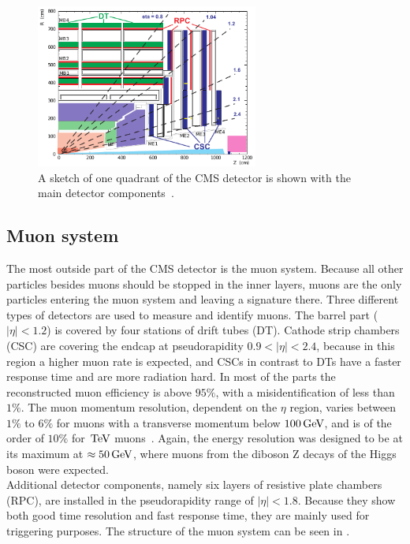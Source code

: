 \begin{figure}[tbp]
 \centering
 \includegraphics[width=0.65\textwidth]{figures/general/muonChamber}
 \caption{A sketch of one quadrant of the CMS detector is shown with the main detector components~\cite{CMSTDR}.}
 \label{fig:etaPlaneCMSTotal}
\end{figure}

\subsection{Muon system}
The most outside part of the CMS detector is the muon system. Because all other particles besides muons should be stopped in the inner layers, muons are the only particles entering the muon system and leaving a signature there. Three different types of detectors are used to measure and identify muons. The barrel part ($|\eta|<1.2$) is covered by four stations of drift tubes (DT). Cathode strip chambers (CSC) are covering the endcap at pseudorapidity $0.9<|\eta|<2.4$, because in this region a higher muon rate is expected, and CSCs in contrast to DTs have a faster response time and are more radiation hard. In most of the parts the reconstructed muon efficiency is above $95\%$, with a misidentification of less than $1\%$. The muon momentum resolution, dependent on the $\eta$ region, varies between $1\%$ to $6\%$ for muons with a transverse momentum below $100\,\text{Ge\hspace{-.08em}V}$, and is of the order of $10\%$ for $\,\text{Te\hspace{-.08em}V}$ muons~\cite{MuonPerformance}. Again, the energy resolution was designed to be at its maximum at $\approx50\,\text{Ge\hspace{-.08em}V}$, where muons from the diboson Z decays of the Higgs boson were expected.\\
Additional detector components, namely six layers of resistive plate chambers (RPC), are installed in the pseudorapidity range of $|\eta|<1.8$. Because they show both good time resolution and fast response time, they are mainly used for triggering purposes. The structure of the muon system can be seen in .

